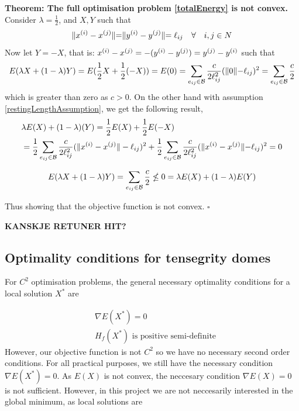 \textbf{Theorem: The full optimisation problem \eqref{totalEnergy} is not convex.}\\
Consider $\lambda = \frac{1}{2}$, and $X,Y$ such that 
\begin{equation}
\label{restingLengthAssumption}
    \rVert x^{(i)}-x^{(j)} \lVert = \rVert y^{(i)}-y^{(j)} \lVert = \ell_{ij} \quad \forall \quad i,j \in N
\end{equation}
Now let $Y = -X$, that is: $x^{(i)}-x^{(j)} = -(y^{(i)}-y^{(j)}) = y^{(j)}-y^{(i)}$ such that
\begin{equation}
\label{energyConv1}
    E(\lambda X + (1-\lambda) Y) = E(\frac{1}{2}X + \frac{1}{2}(-X)) 
    = E(0) = \sum\limits_{e_{ij} \in \mathcal{B}} \frac{c}{2 \ell_{ij}^2} ( \rVert 0 \lVert - \ell_{ij})^2 = \sum\limits_{e_{ij} \in \mathcal{B}}\frac{c}{2}     
\end{equation}
which is greater than zero as $c>0$.
On the other hand with assumption \eqref{restingLengthAssumption}, we get the following result,
\begin{equation}
\label{energyConv2}
\begin{aligned}    
    &\lambda E(X) + (1-\lambda)(Y) = \frac{1}{2}E(X) + \frac{1}{2}E(-X) \\&
    = \frac{1}{2}\sum\limits_{e_{ij} \in \mathcal{B}} \frac{c}{2\ell_{ij}^2} (\lVert x^{(i)} - x^{(j)}\rVert - \ell_{ij})^2 + \frac{1}{2} \sum\limits_{e_{ij} \in \mathcal{B}}\frac{c}{2\ell_{ij}^2} (\rVert x^{(i)}-x^{(j)}\lVert-\ell_{ij})^2 = 0
    \end{aligned}
\end{equation}

\begin{equation*}
     E(\lambda X + (1-\lambda) Y) = \sum\limits_{e_{ij} \in \mathcal{B}}\frac{c}{2}  \nleq 0  = \lambda E(X) + (1-\lambda)E(Y)
\end{equation*}

Thus showing that the objective function is not convex. \hfill $\square$

\textbf{KANSKJE RETUNER HIT?}

\subsection{Optimality conditions for tensegrity domes}
For $C^2$ optimisation problems, the general necessary optimality conditions for a local solution $X^*$ are

\begin{align*}
    &\nabla E(X^*) = 0\\
    & H_f(X^*) \text{ is positive semi-definite}
\end{align*}
However, our objective function is not $C^2$ so we have no necessary second order conditions. For all practical purposes, we still have the necessary condition $\nabla E(X^*) = 0$. As $E(X)$ is not convex, the neccesary condition $\nabla E(X)=0$ is not sufficient. However, in this project we are not neccesarily interested in the global minimum, as local solutions are 

